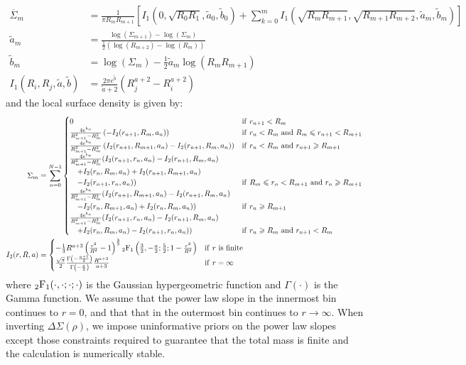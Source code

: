 \documentclass[usenatbib]{mnras}
\begin{document}
\begin{align}
\overline{\Sigma}_m &= \frac{1}{\pi R_mR_{m+1}}\left[I_1(0, \sqrt{R_0R_1}, \tilde{a}_0, \tilde{b}_0) + 
\sum_{k=0}^m I_1(\sqrt{R_mR_{m+1}},\sqrt{R_{m+1}R_{m+2}}, \tilde{a}_m, \tilde{b}_m)\right]\\
  \tilde{a}_m &= \frac{\log(\Sigma_{m+1})-\log(\Sigma_m)}{\frac{1}{2}\left(\log(R_{m+2})-\log(R_m)\right)}\\
  \tilde{b}_m &= \log(\Sigma_m) - \frac{1}{2}\tilde{a}_m\log(R_mR_{m+1})\\
  I_1(R_i,R_j,\tilde{a},\tilde{b}) &= \frac{2\pi e^{\tilde{b}}}{\tilde{a}+2}\left(R_j^{a+2} - R_i^{a+2}\right)
\end{align}
\noindent and the local surface density is given by:
\begin{align}
  \Sigma_m &= \sum_{n=0}^{N-1}
  \begin{cases}
    0 & {\rm if}\ r_{n+1} < R_m\\
    \frac{4e^{b_n}}{R_{m+1}^2-R_m^2} \left(-I_2(r_{n+1},R_m,a_n)\right) & {\rm if}\ r_n < R_m\ {\rm and}\ R_m \leq r_{n+1} < R_{m+1}\\
    \frac{4e^{b_n}}{R_{m+1}^2-R_m^2} \left(I_2(r_{n+1},R_{m+1},a_n)-I_2(r_{n+1},R_m,a_n)\right) & {\rm if}\ r_n < R_m\ {\rm and}\ r_{n+1} \geq R_{m+1}\\
    \frac{4e^{b_n}}{R_{m+1}^2-R_m^2} (I_2(r_{n+1},r_n,a_n)-I_2(r_{n+1},R_m,a_n)\\ \quad +I_2(r_n,R_m,a_n)+I_2(r_{n+1},R_{m+1},a_n)\\ \quad -I_2(r_{n+1},r_n,a_n)) & {\rm if}\ R_m \leq r_n < R_{m+1}\ {\rm and}\ r_n \geq R_{m+1}\\
    \frac{4e^{b_n}}{R_{m+1}^2-R_m^2} (I_2(r_{n+1},R_{m+1},a_n)-I_2(r_{n+1},R_m,a_n)\\ \quad -I_2(r_n,R_{m+1},a_n)+I_2(r_n,R_m,a_n)) & {\rm if}\ r_n \geq R_{m+1}\\
    \frac{4e^{b_n}}{R_{m+1}^2-R_m^2} (I_2(r_{n+1},r_n,a_n)-I_2(r_{n+1},R_m,a_n)\\ \quad +I_2(r_n,R_m,a_n)-I_2(r_{n+1},r_n,a_n)) & {\rm if}\ r_n \geq R_m\ {\rm and}\ r_{n+1} < R_m\\
  \end{cases}\\
  I_2(r,R,a) &=
  \begin{cases}
    -\frac{1}{3}R^{a+3}\left(\frac{r^2}{R^2}-1\right)^{\frac{3}{2}}{}_2{\rm F}_1\left(\frac{3}{2},-\frac{a}{2};\frac{5}{2};1-\frac{r^2}{R^2}\right) & {\rm if}\ r\ {\rm is}\ {\rm finite}\\
    \frac{\sqrt{\pi}}{2}\frac{\Gamma\left(-\frac{a+1}{2}\right)}{\Gamma\left(-\frac{a}{2}\right)}\frac{R^{a+3}}{a+3} & {\rm if}\ r=\infty
  \end{cases}
\end{align}
where ${}_2{\rm F}_1(\cdot,\cdot;\cdot;\cdot)$ is the Gaussian hypergeometric function and $\Gamma(\cdot)$ is the Gamma function. We assume that the power law slope in the innermost bin continues to $r=0$, and that that in the outermost bin continues to $r\rightarrow\infty$. When inverting $\Delta\Sigma(\rho)$, we impose uninformative priors on the power law slopes except those constraints required to guarantee that the total mass is finite and the calculation is numerically stable.

\bsp	%
\label{lastpage}
\end{document}
